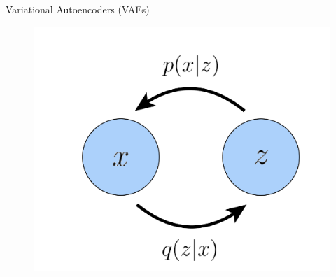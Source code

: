 \begin{frame}{Variational Autoencoders (VAEs)}
    \begin{figure}
        \centering
        \includegraphics[width=0.5\linewidth]{images/vae_graph.png}
    \end{figure}
\end{frame}